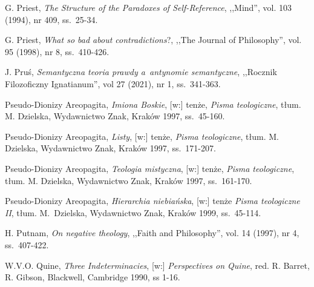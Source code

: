 \begin{thebibliography}{100}

G. Priest, \textit{The Structure of the Paradoxes of Self-Reference}, ,,Mind'', vol. 103 (1994), nr 409, ss.~25-34.

G. Priest, \textit{What so bad about contradictions}?, ,,The Journal of Philosophy'', vol. 95 (1998), nr 8, ss.~410-426.

J. Pruś, \textit{Semantyczna teoria prawdy a~antynomie semantyczne}, ,,Rocznik Filozoficzny Ignatianum'', vol 27 (2021), nr 1, ss.~341-363.

%


Pseudo-Dionizy Areopagita, \textit{Imiona Boskie}, [w:] tenże, \textit{Pisma teologiczne}, tłum. M. Dzielska, Wydawnictwo Znak, Kraków 1997, ss.~45-160.

Pseudo-Dionizy Areopagita, \textit{Listy}, [w:] tenże, \textit{Pisma teologiczne}, tłum. M. Dzielska, Wydawnictwo Znak, Kraków 1997, ss.~171-207.

Pseudo-Dionizy Areopagita, \textit{Teologia mistyczna}, [w:] tenże, \textit{Pisma teologiczne}, tłum. M. Dzielska, Wydawnictwo Znak, Kraków 1997, ss.~161-170.

Pseudo-Dionizy Areopagita, \textit{Hierarchia niebiańska}, [w:] tenże  \textit{Pisma teologiczne II}, tłum. M.~Dzielska, Wydawnictwo Znak, Kraków 1999, ss.~45-114.


H. Putnam, \textit{On negative theology}, ,,Faith and Philosophy'', vol. 14 (1997), nr 4, ss.~407-422.

W.V.O. Quine, \textit{Three Indeterminacies}, [w:] \textit{Perspectives on Quine}, red. R. Barret, R. Gibson, Blackwell, Cambridge 1990, ss 1-16.


\end{thebibliography}
